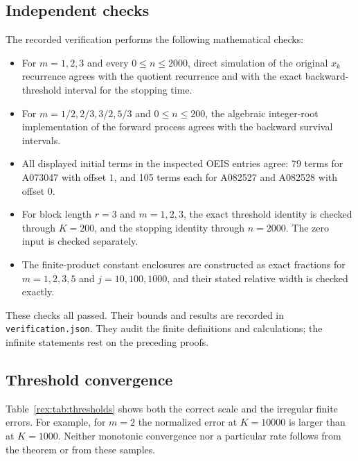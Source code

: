 \subsection{Independent checks}

The recorded verification performs the following mathematical checks:
\begin{itemize}
\item For $m=1,2,3$ and every $0\leq n\leq2000$, direct simulation of
the original $x_k$ recurrence agrees with the quotient recurrence and
with the exact backward-threshold interval for the stopping time.
\item For $m=1/2,2/3,3/2,5/3$ and $0\leq n\leq200$, the algebraic
integer-root implementation of the forward process agrees with the
backward survival intervals.
\item All displayed initial terms in the inspected OEIS entries agree:
79 terms for A073047 with offset $1$, and 105 terms each for A082527
and A082528 with offset $0$.
\item For block length $r=3$ and $m=1,2,3$, the exact threshold identity
is checked through $K=200$, and the stopping identity through $n=2000$.
The zero input is checked separately.
\item The finite-product constant enclosures are constructed as exact
fractions for $m=1,2,3,5$ and $j=10,100,1000$, and their stated relative
width is checked exactly.
\end{itemize}
These checks all passed. Their bounds and results are recorded in
\texttt{verification.json}. They audit the finite definitions and
calculations; the infinite statements rest on the preceding proofs.

\subsection{Threshold convergence}

\begin{table}[p]
\centering
\small

\caption{Exact backward thresholds and numerical normalizations.
The last column tends to $1$ by \cref{rex:thm:main}; its displayed values
use high-precision evaluation of $c_m$. The full data file also includes
$K=100000$. The exponent $m=1/2$ uses exact integer square roots.}
\label{rex:tab:thresholds}
\end{table}

Table~\ref{rex:tab:thresholds} shows both the correct scale and the irregular
finite errors. For example, for $m=2$ the normalized error at $K=10000$
is larger than at $K=1000$. Neither monotonic convergence nor a
particular rate follows from the theorem or from these samples.


